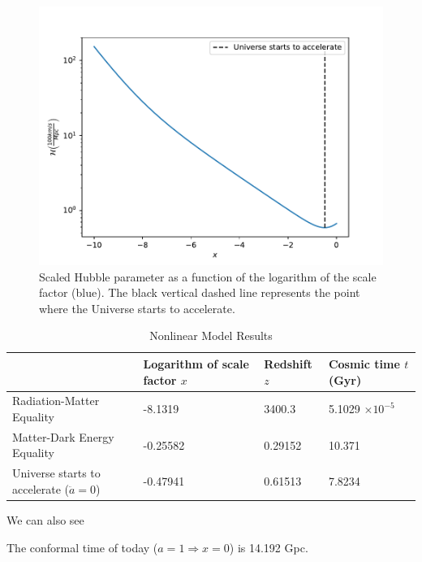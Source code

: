\documentclass{aa}
\begin{document}
\begin{figure}[ht]
\centering
\includegraphics[width=\hsize]{figures/Hp.pdf}
  \caption{Scaled Hubble parameter as a function of the logarithm of the scale factor (blue). The black vertical dashed line represents the point where the Universe starts to accelerate.}
     \label{fig:Hp}
\end{figure}

\begin{table}[ht]
\caption{Nonlinear Model Results}             
\label{table:times}      
\centering          
\begin{tabular}{l l l l}     %
\hline\hline       
& Logarithm of scale factor $x$      & Redshift $z$     & Cosmic time $t$ (Gyr)\\ 
\hline                    
Radiation-Matter Equality   & -8.1319  & 3400.3  & 5.1029 $\times 10^{-5}$ \\
Matter-Dark Energy Equality & -0.25582 & 0.29152 & 10.371                 \\
Universe starts to accelerate ($\ddot a = 0$)               & -0.47941 & 0.61513 & 7.8234\\ 
\hline                  
\end{tabular}
\end{table}

We can also see 

The conformal time of today ($a = 1 \Rightarrow x = 0$) is 14.192 Gpc.
\end{document}
